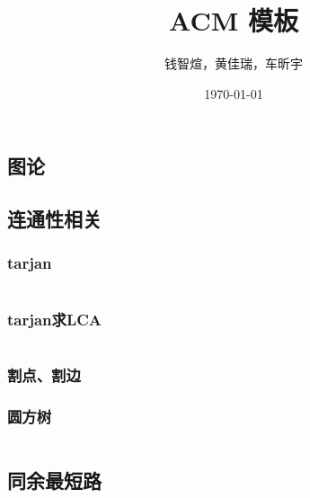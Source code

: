 \documentclass[12pt, a4paper, oneside]{ctexart}
\title{ACM 模板}
\author{钱智煊，黄佳瑞，车昕宇}
\date{\today}
\begin{document}
    \scriptsize
    \maketitle
    \newpage
    
    \begin{multicols}{2}
        \tableofcontents
        \newpage
        
        \section{图论}
        \subsection{连通性相关}
        \subsubsection{tarjan}
        \inputminted{cpp}{src/graph/tarjan.cpp}
        \subsubsection{tarjan求LCA}
        
        \inputminted{cpp}{src/graph/tarjan_lca.cpp}
        \subsubsection{割点、割边}
        
        \subsubsection{圆方树}
        
        \inputminted{cpp}{src/graph/圆方树.cpp}
        \subsection{同余最短路}
        
    \end{multicols}
\end{document}
